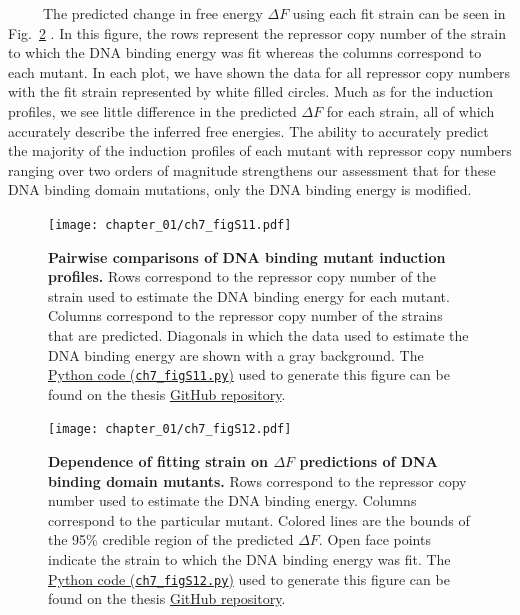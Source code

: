 \documentclass[12pt]{caltech_thesis}
\begin{document}
~~~~~The predicted change in free energy \(\Delta F\) using each fit
strain can be seen in Fig.~\ref{fig:DNA_delF_pairwise_comparison} . In
this figure, the rows represent the repressor copy number of the strain
to which the DNA binding energy was fit whereas the columns correspond
to each mutant. In each plot, we have shown the data for all repressor
copy numbers with the fit strain represented by white filled circles.
Much as for the induction profiles, we see little difference in the
predicted \(\Delta F\) for each strain, all of which accurately describe
the inferred free energies. The ability to accurately predict the
majority of the induction profiles of each mutant with repressor copy
numbers ranging over two orders of magnitude strengthens our assessment
that for these DNA binding domain mutations, only the DNA binding energy
is modified.

\hypertarget{fig:DNA_profile_pairwise_comparisons}{%
\begin{figure}
\centering
\texttt{[image: chapter\_01/ch7\_figS11.pdf]}
\caption[{Pairwise comparisons of DNA binding mutant estimated induction
profiles.}]{\textbf{Pairwise comparisons of DNA binding mutant induction
profiles.} Rows correspond to the repressor copy number of the strain
used to estimate the DNA binding energy for each mutant. Columns
correspond to the repressor copy number of the strains that are
predicted. Diagonals in which the data used to estimate the DNA binding
energy are shown with a gray background. The
\href{https://github.com/gchure/phd/blob/master/src/chapter_07/code/ch7_figS11.py}{Python
code (\texttt{ch7\_figS11.py})} used to generate this figure can be
found on the thesis \href{https://github.com/gchure/phd}{GitHub
repository}.}
\label{fig:DNA_profile_pairwise_comparisons}
\end{figure}
}

\hypertarget{fig:DNA_delF_pairwise_comparison}{%
\begin{figure}
\centering
\texttt{[image: chapter\_01/ch7\_figS12.pdf]}
\caption[{Dependence of fitting strain on \(\Delta F\) predictions of
DNA binding domain mutants.}]{\textbf{Dependence of fitting strain on
\(\Delta F\) predictions of DNA binding domain mutants.} Rows correspond
to the repressor copy number used to estimate the DNA binding energy.
Columns correspond to the particular mutant. Colored lines are the
bounds of the 95\% credible region of the predicted \(\Delta F\). Open
face points indicate the strain to which the DNA binding energy was fit.
The
\href{https://github.com/gchure/phd/blob/master/src/chapter_07/code/ch7_figS12.py}{Python
code (\texttt{ch7\_figS12.py})} used to generate this figure can be
found on the thesis \href{https://github.com/gchure/phd}{GitHub
repository}.}
\label{fig:DNA_delF_pairwise_comparison}
\end{figure}
}
\end{document}
